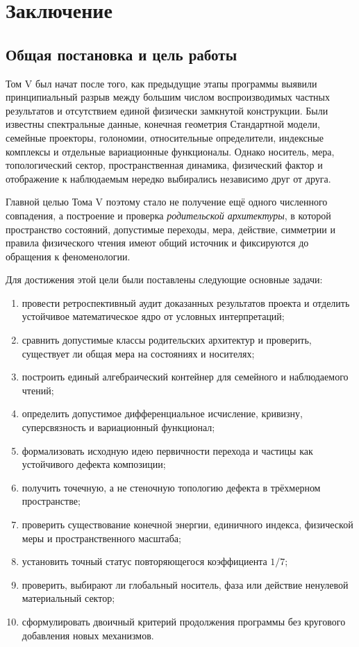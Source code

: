 \chapter*{Заключение}

\section*{Общая постановка и цель работы}

Том V был начат после того, как предыдущие этапы программы выявили
принципиальный разрыв между большим числом воспроизводимых частных
результатов и отсутствием единой физически замкнутой конструкции. Были
известны спектральные данные, конечная геометрия Стандартной модели,
семейные проекторы, голономии, относительные определители, индексные
комплексы и отдельные вариационные функционалы. Однако носитель, мера,
топологический сектор, пространственная динамика, физический фактор и
отображение к наблюдаемым нередко выбирались независимо друг от друга.

Главной целью Тома V поэтому стало не получение ещё одного численного
совпадения, а построение и проверка \emph{родительской архитектуры}, в
которой пространство состояний, допустимые переходы, мера, действие,
симметрии и правила физического чтения имеют общий источник и фиксируются
до обращения к феноменологии.

Для достижения этой цели были поставлены следующие основные задачи:
\begin{enumerate}
 \item провести ретроспективный аудит доказанных результатов проекта и
 отделить устойчивое математическое ядро от условных интерпретаций;
 \item сравнить допустимые классы родительских архитектур и проверить,
 существует ли общая мера на состояниях и носителях;
 \item построить единый алгебраический контейнер для семейного и
 наблюдаемого чтений;
 \item определить допустимое дифференциальное исчисление, кривизну,
 суперсвязность и вариационный функционал;
 \item формализовать исходную идею первичности перехода и частицы как
 устойчивого дефекта композиции;
 \item получить точечную, а не стеночную топологию дефекта в трёхмерном
 пространстве;
 \item проверить существование конечной энергии, единичного индекса,
 физической меры и пространственного масштаба;
 \item установить точный статус повторяющегося коэффициента $1/7$;
 \item проверить, выбирают ли глобальный носитель, фаза или действие
 ненулевой материальный сектор;
 \item сформулировать двоичный критерий продолжения программы без
 кругового добавления новых механизмов.
\end{enumerate}

